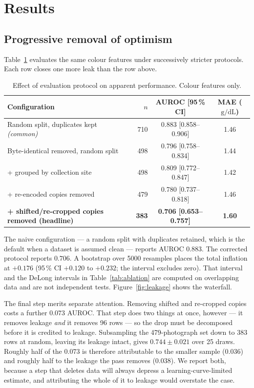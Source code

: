 \documentclass[11pt,a4paper]{article}
\newcommand{\gdl}{\ensuremath{\mathrm{g/dL}}}
\newcommand{\auroc}{AUROC}
\begin{document}
\section{Results}

\subsection{Progressive removal of optimism}

Table~\ref{tab:waterfall} evaluates the same colour features under successively stricter
protocols. Each row closes one more leak than the row above.

\begin{table}[htbp]
\centering
\caption{Effect of evaluation protocol on apparent performance. Colour features only.}
\label{tab:waterfall}
\small
\begin{tabular}{lrcc}
\toprule
Configuration & $n$ & \auroc{} [95\,\% CI] & MAE (\gdl) \\
\midrule
Random split, duplicates kept \emph{(common)} & 710 & 0.883 [0.858--0.906] & 1.46 \\
Byte-identical removed, random split                & 498 & 0.796 [0.758--0.834] & 1.44 \\
\quad + grouped by collection site                  & 498 & 0.809 [0.772--0.847] & 1.42 \\
\quad + re-encoded copies removed                   & 479 & 0.780 [0.737--0.818] & 1.46 \\
\textbf{\quad + shifted/re-cropped copies removed (headline)}
                                                    & \textbf{383}
                                                    & \textbf{0.706 [0.653--0.757]}
                                                    & \textbf{1.60} \\
\bottomrule
\end{tabular}
\end{table}

The naive configuration --- a random split with duplicates retained, which is the default when a
dataset is assumed clean --- reports \auroc{} $0.883$. The corrected protocol reports $0.706$. A
bootstrap over 5000 resamples places the total inflation at $+0.176$ (95\,\% CI $+0.120$ to
$+0.232$; the interval excludes zero). That interval and the DeLong intervals in
Table~\ref{tab:ablation} are computed on overlapping data and are not independent tests.
Figure~\ref{fig:leakage} shows the waterfall.

The final step merits separate attention. Removing shifted and re-cropped copies costs a further
$0.073$ \auroc{}. That step does two things at once, however --- it removes leakage \emph{and} it
removes 96 rows --- so the drop must be decomposed before it is credited to leakage. Subsampling
the 479-photograph set down to 383 rows at random, leaving its leakage intact, gives
$0.744 \pm 0.021$ over 25 draws. Roughly half of the $0.073$ is therefore attributable to the
smaller sample ($0.036$) and roughly half to the leakage the pass removes ($0.038$). We report
both, because a step that deletes data will always depress a learning-curve-limited estimate, and
attributing the whole of it to leakage would overstate the case.
\end{document}

